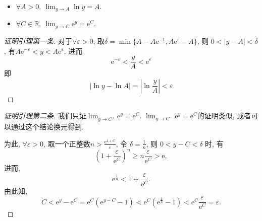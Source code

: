 \begin{lemma}\label{指数和对数的极限}
    \begin{itemize}
        \item $\displaystyle \forall A > 0,\ \lim_{y \to A} \ln y = A$.
        \item $\displaystyle \forall C \in \mathbb{R},\ \lim_{y \to C} \mathrm{e}^{y} = \mathrm{e}^{C}$.
    \end{itemize}
\end{lemma}
\begin{proof}[证明引理第一条]
    对于$\forall \varepsilon > 0$, 取$\delta = \min \{ A - A \mathrm{e}^{-1} , A \mathrm{e}^{\varepsilon} - A \}$, 则
    $0 < \left| y - A \right| < \delta$, 有$A \mathrm{e}^{- \varepsilon} < y < A \mathrm{e}^{\varepsilon}$, 进而
    \begin{equation}
      \mathrm{e}^{-\varepsilon} < \frac{y}{A} < \mathrm{e}^{\varepsilon}
    \end{equation}
    即
    \begin{equation}
      \left| \ln y - \ln A \right| = \left| \ln \frac{y}{A} \right| < \varepsilon
    \end{equation}
\end{proof}

\begin{proof}[证明引理第二条]
    我们只证$\displaystyle \lim_{y \to C^{+}} \mathrm{e}^{y} = \mathrm{e}^{C}$. $\displaystyle \lim_{y \to C^{-}} \mathrm{e}^{y} = \mathrm{e}^{C}$的证明类似, 或者可以通过这个结论换元得到.
    
    为此, $\forall \varepsilon > 0$, 取一个正整数$n > \frac{\mathrm{e}^{1+C}}{\varepsilon} $, 令 $\delta = \frac{1}{n}$, 则 $0 < y - C < \delta$ 时, 有
    \begin{equation}
      \left( 1 + \frac{\varepsilon}{\mathrm{e}^{C}} \right) ^{n} \ge n \frac{\varepsilon}{\mathrm{e}^{C}} > \mathrm{e},
    \end{equation}
    进而, 
    \begin{equation}
      \mathrm{e}^{\frac{1}{n}} < 1 + \frac{\varepsilon}{\mathrm{e}^{C}}.
    \end{equation}
    由此知,
    \begin{equation}
      C < \mathrm{e}^{y} - \mathrm{e}^{C} = \mathrm{e}^{C} \left( \mathrm{e}^{y-C} - 1 \right) < \mathrm{e}^{C} \left( \mathrm{e}^{\frac{1}{n}} - 1 \right) < \mathrm{e}^{C} \frac{\varepsilon}{\mathrm{e}^{C}} = \varepsilon.
    \end{equation}
\end{proof}

